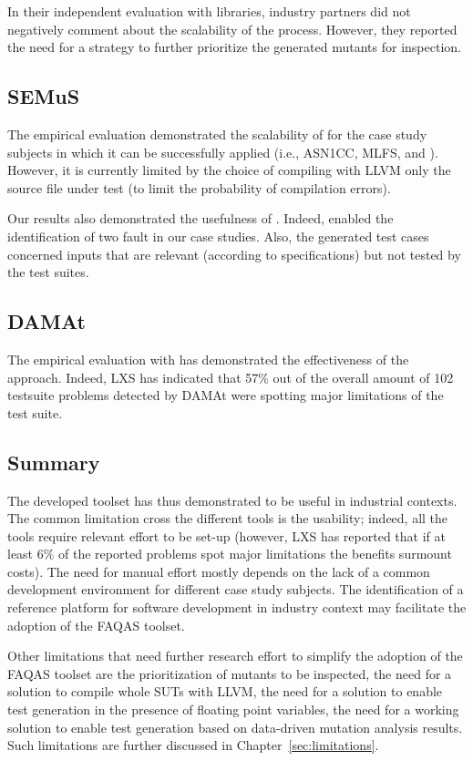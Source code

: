 In their independent evaluation with libraries, industry partners did not negatively comment about the scalability of the process. However, they reported the need for a strategy to further prioritize the generated mutants for inspection.

\subsection*{SEMuS}

The empirical evaluation demonstrated the scalability of \SEMUS for the case study subjects in which it can be successfully applied (i.e., ASN1CC, MLFS, and \UTIL). However, it is currently limited by the choice of compiling with LLVM only the source file under test (to limit the probability of compilation errors).

Our results also demonstrated the usefulness of \SEMUS. Indeed, \SEMUS enabled the identification of two fault in our case studies. Also, the generated test cases concerned inputs that are relevant (according to specifications) but not tested by the test suites.


\subsection*{DAMAt}

The empirical evaluation with \ESAIL has demonstrated the effectiveness of the approach. Indeed, LXS has indicated that 57\% out of the overall amount of 102 testsuite problems detected by DAMAt were spotting major limitations of the test suite.


\subsection*{Summary}

The developed toolset has thus demonstrated to be useful in industrial contexts. The common limitation cross the different tools is the usability; indeed, all the tools require relevant effort to be set-up (however, LXS has reported that if at least 6\% of the reported problems spot major limitations the benefits surmount costs). The need for manual effort mostly depends on the lack of a common development environment for different case study subjects. The identification of a reference platform for software development in industry context may facilitate the adoption of the FAQAS toolset.

Other limitations that need further research effort to simplify the adoption of the FAQAS toolset are the prioritization of mutants to be inspected, the need for a solution to compile whole SUTs with LLVM, the need for a solution to enable test generation in the presence of floating point variables, the need for a working solution to enable test generation based on data-driven mutation analysis results. Such limitations are further discussed in Chapter~\ref{sec:limitations}.